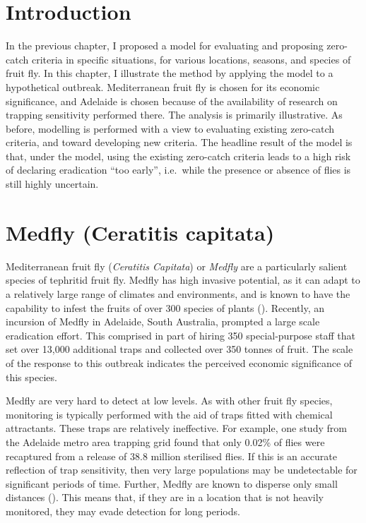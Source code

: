 \documentclass[
  oneside]{book}
\begin{document}
\hypertarget{introduction-3}{%
\section{Introduction}\label{introduction-3}}

In the previous chapter, I proposed a model for evaluating and proposing zero-catch criteria in specific situations, for various locations, seasons, and species of fruit fly. In this chapter, I illustrate the method by applying the model to a hypothetical outbreak. Mediterranean fruit fly is chosen for its economic significance, and Adelaide is chosen because of the availability of research on trapping sensitivity performed there. The analysis is primarily illustrative. As before, modelling is performed with a view to evaluating existing zero-catch criteria, and toward developing new criteria. The headline result of the model is that, under the model, using the existing zero-catch criteria leads to a high risk of declaring eradication ``too early'', i.e.~while the presence or absence of flies is still highly uncertain.

\hypertarget{medfly-ceratitis-capitata}{%
\section{Medfly (Ceratitis capitata)}\label{medfly-ceratitis-capitata}}

Mediterranean fruit fly (\emph{Ceratitis Capitata}) or \emph{Medfly} are a particularly salient species of tephritid fruit fly. Medfly has high invasive potential, as it can adapt to a relatively large range of climates and environments, and is known to have the capability to infest the fruits of over 300 species of plants (\citet{sciarretta2018}). Recently, an incursion of Medfly in Adelaide, South Australia, prompted a large scale eradication effort. This comprised in part of hiring 350 special-purpose staff that set over 13,000 additional traps and collected over 350 tonnes of fruit. The scale of the response to this outbreak indicates the perceived economic significance of this species.

Medfly are very hard to detect at low levels. As with other fruit fly species, monitoring is typically performed with the aid of traps fitted with chemical attractants. These traps are relatively ineffective. For example, one study from the Adelaide metro area trapping grid found that only 0.02\% of flies were recaptured from a release of 38.8 million sterilised flies. If this is an accurate reflection of trap sensitivity, then very large populations may be undetectable for significant periods of time. Further, Medfly are known to disperse only small distances (\citet{ms2007}). This means that, if they are in a location that is not heavily monitored, they may evade detection for long periods.
\end{document}
